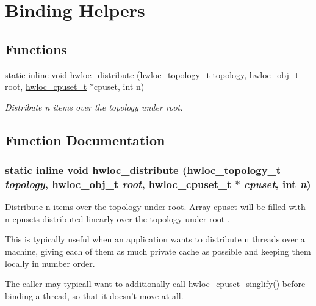 \hypertarget{group__hwlocality__helper__binding}{
\section{Binding Helpers}
\label{group__hwlocality__helper__binding}
}
\subsection*{Functions}
\begin{DoxyCompactItemize}
\item 
static inline void \hyperlink{group__hwlocality__helper__binding_gaea68e92b026930cf5c368e2d98cb6aac}{hwloc\_\-distribute} (\hyperlink{group__hwlocality__topology_ga9d1e76ee15a7dee158b786c30b6a6e38}{hwloc\_\-topology\_\-t} topology, \hyperlink{structhwloc__obj}{hwloc\_\-obj\_\-t} root, \hyperlink{group__hwlocality__cpuset_ga7366332f7090f5b54d4b25a0c2c4b411}{hwloc\_\-cpuset\_\-t} $\ast$cpuset, int n)
\begin{DoxyCompactList}\small\item\em Distribute {\ttfamily n} items over the topology under {\ttfamily root}. \item\end{DoxyCompactList}\end{DoxyCompactItemize}


\subsection{Function Documentation}
\hypertarget{group__hwlocality__helper__binding_gaea68e92b026930cf5c368e2d98cb6aac}{
\subsubsection[{hwloc\_\-distribute}]{\setlength{\rightskip}{0pt plus 5cm}static inline void hwloc\_\-distribute ({\bf hwloc\_\-topology\_\-t} {\em topology}, \/  {\bf hwloc\_\-obj\_\-t} {\em root}, \/  {\bf hwloc\_\-cpuset\_\-t} $\ast$ {\em cpuset}, \/  int {\em n})}}
\label{group__hwlocality__helper__binding_gaea68e92b026930cf5c368e2d98cb6aac}


Distribute {\ttfamily n} items over the topology under {\ttfamily root}. Array {\ttfamily cpuset} will be filled with {\ttfamily n} cpusets distributed linearly over the topology under {\ttfamily root} .

This is typically useful when an application wants to distribute {\ttfamily n} threads over a machine, giving each of them as much private cache as possible and keeping them locally in number order.

The caller may typicall want to additionally call \hyperlink{group__hwlocality__cpuset_ga548a6620cce008fc5b1e2110d25135fe}{hwloc\_\-cpuset\_\-singlify()} before binding a thread, so that it doesn't move at all. 
